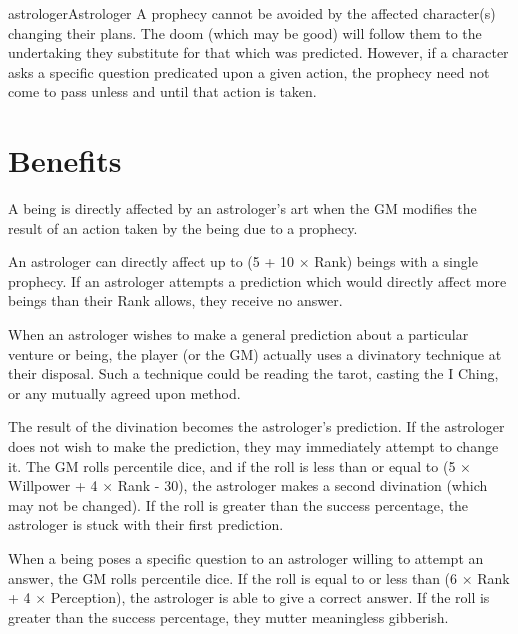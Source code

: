 \begin{Skill}{astrologer}{Astrologer}
A prophecy cannot be avoided by the affected character(s) changing
their plans.  The doom (which may be good) will follow them to the
undertaking they substitute for that which was predicted.  However,
if a character asks a specific question predicated upon a given
action, the prophecy need not come to pass unless and until that
action is taken.

\section{Benefits}


A being is directly affected by an astrologer’s art when the GM
modifies the result of an action taken by the being due to a prophecy.

An astrologer can directly affect up to (5 + 10 × Rank) beings with a
single prophecy. If an astrologer attempts a prediction which would
directly affect more beings than their Rank allows, they receive no
answer.


When an astrologer wishes to make a general prediction about a
particular venture or being, the player (or the GM) actually uses a
divinatory technique at their disposal.  Such a technique could be
reading the tarot, casting the I Ching, or any mutually agreed upon
method.

The result of the divination becomes the astrologer’s prediction.  If
the astrologer does not wish to make the prediction, they may
immediately attempt to change it.  The GM rolls percentile dice, and
if the roll is less than or equal to (5 × Willpower + 4 × Rank - 30),
the astrologer makes a second divination (which may not be changed).
If the roll is greater than the success percentage, the astrologer is
stuck with their first prediction.


When a being poses a specific question to an astrologer willing to
attempt an answer, the GM rolls percentile dice. If the roll is equal
to or less than (6 × Rank + 4 × Perception), the astrologer is able to
give a correct answer. If the roll is greater than the success
percentage, they mutter meaningless gibberish.


\end{Skill}
